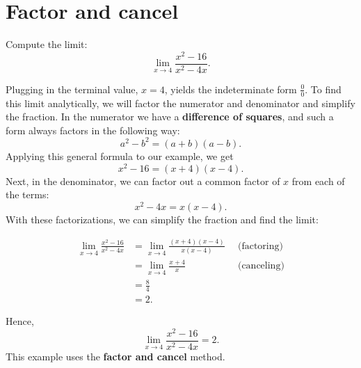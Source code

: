 \documentclass{ximera}
\begin{document}






\section{Factor and cancel}

\begin{example}[example 2]
Compute the limit: \[\lim_{x \to 4} \frac{x^2 - 16}{x^2 - 4x}.\]


Plugging in the terminal value, $x=4$, yields 
the indeterminate form $\frac00$.  To find this limit analytically, we will factor the numerator 
and denominator and simplify the fraction. In the numerator we have a \textbf{difference of squares}, and 
such a form always factors in the following way:
\[a^2 - b^2 = (a+b)(a-b).\]
Applying this general formula to our example, we get 
\[x^2 - 16 = (x+4)(x-4).\]  
Next, in the denominator, we can factor out a common factor
of $x$ from each of the terms:
\[x^2 - 4x = x(x-4).\]
With these factorizations, we can simplify the fraction and find the limit:

\begin{align*}
\lim_{x \to 4} \frac{x^2 - 16}{x^2 - 4x} &= \lim_{x \to 4} \frac{(x+4)(x-4)}{x(x-4)} \enspace & \text{(factoring)} \\
                                         &= \lim_{x \to 4} \frac{x+4}{x} & \text{(canceling)} \\
                                         &= \frac84  &  \\
																				 &= 2. &
\end{align*}																				
																				
Hence,
\[\lim_{x \to 4} \frac{x^2 - 16}{x^2 - 4x} = 2.\]
This example uses the \textbf{factor and cancel} method.
\end{example}
\end{document}
